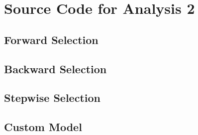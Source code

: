 \documentclass[11pt]{scrartcl} %
\begin{document}
\section{Source Code for Analysis 2}
\label{sec:Analysis2}

\subsection{Forward Selection}


\subsection{Backward Selection}


\subsection{Stepwise Selection}
	

\subsection{Custom Model}
	
\pagebreak
\end{document}
